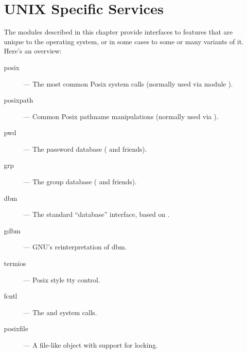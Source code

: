 \chapter{UNIX Specific Services}

The modules described in this chapter provide interfaces to features
that are unique to the \UNIX{} operating system, or in some cases to
some or many variants of it.  Here's an overview:

\begin{description}

\item[posix]
--- The most common Posix system calls (normally used via module ).

\item[posixpath]
--- Common Posix pathname manipulations (normally used via ).

\item[pwd]
--- The password database ( and friends).

\item[grp]
--- The group database ( and friends).

\item[dbm]
--- The standard ``database'' interface, based on .

\item[gdbm]
--- GNU's reinterpretation of dbm.

\item[termios]
--- Posix style tty control.

\item[fcntl]
--- The  and  system calls.

\item[posixfile]
--- A file-like object with support for locking.

\end{description}
